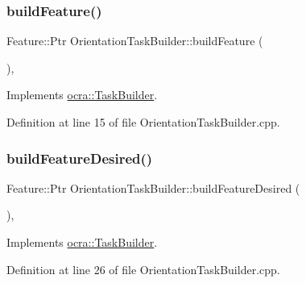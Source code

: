 \subsubsection{\texorpdfstring{build\+Feature()}{buildFeature()}}
{\footnotesize\ttfamily Feature\+::\+Ptr Orientation\+Task\+Builder\+::build\+Feature (\begin{DoxyParamCaption}{ }\end{DoxyParamCaption})\hspace{0.3cm}{\ttfamily [protected]}, {\ttfamily [virtual]}}



Implements \hyperlink{classocra_1_1TaskBuilder_a58c0dc416a9607a344a080248ee26ac2}{ocra\+::\+Task\+Builder}.



Definition at line 15 of file Orientation\+Task\+Builder.\+cpp.

\hypertarget{classocra_1_1OrientationTaskBuilder_af5f11bdd9c43cb52e29054c6b293d533}{}\label{classocra_1_1OrientationTaskBuilder_af5f11bdd9c43cb52e29054c6b293d533} 
\subsubsection{\texorpdfstring{build\+Feature\+Desired()}{buildFeatureDesired()}}
{\footnotesize\ttfamily Feature\+::\+Ptr Orientation\+Task\+Builder\+::build\+Feature\+Desired (\begin{DoxyParamCaption}{ }\end{DoxyParamCaption})\hspace{0.3cm}{\ttfamily [protected]}, {\ttfamily [virtual]}}



Implements \hyperlink{classocra_1_1TaskBuilder_a7a2c8bcc5d95160d0e48806a2648f1a5}{ocra\+::\+Task\+Builder}.



Definition at line 26 of file Orientation\+Task\+Builder.\+cpp.

\hypertarget{classocra_1_1OrientationTaskBuilder_ab30b211f4aa00ed4c78daae36aca6c42}{}\label{classocra_1_1OrientationTaskBuilder_ab30b211f4aa00ed4c78daae36aca6c42} 
